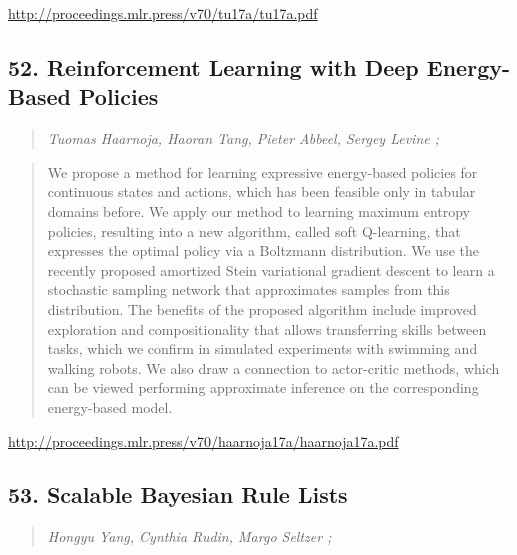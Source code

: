 \documentclass{article}
\begin{document}
\href{http://proceedings.mlr.press/v70/tu17a/tu17a.pdf}{http://proceedings.mlr.press/v70/tu17a/tu17a.pdf}

\subsection{52. Reinforcement Learning with Deep Energy-Based Policies}

\begin{quote}
\footnotesize{\textit{Tuomas Haarnoja, Haoran Tang, Pieter Abbeel, Sergey Levine ;}}
\end{quote}

\begin{quote}
    We propose a method for learning expressive energy-based policies for continuous states and actions, which has been feasible only in tabular domains before. We apply our method to learning maximum entropy policies, resulting into a new algorithm, called soft Q-learning, that expresses the optimal policy via a Boltzmann distribution. We use the recently proposed amortized Stein variational gradient descent to learn a stochastic sampling network that approximates samples from this distribution. The benefits of the proposed algorithm include improved exploration and compositionality that allows transferring skills between tasks, which we confirm in simulated experiments with swimming and walking robots. We also draw a connection to actor-critic methods, which can be viewed performing approximate inference on the corresponding energy-based model.  \end{quote}

\href{http://proceedings.mlr.press/v70/haarnoja17a/haarnoja17a.pdf}{http://proceedings.mlr.press/v70/haarnoja17a/haarnoja17a.pdf}

\subsection{53. Scalable Bayesian Rule Lists}

\begin{quote}
\footnotesize{\textit{Hongyu Yang, Cynthia Rudin, Margo Seltzer ;}}
\end{quote}
\end{document}
